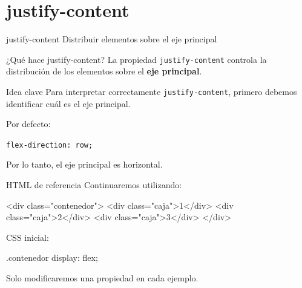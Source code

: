 \documentclass[aspectratio=169,11.5pt]{beamer}
\begin{document}

    \section{justify-content}

    \SectionSlide
    {justify-content}
    {Distribuir elementos sobre el eje principal}

    \begin{frame}{¿Qué hace justify-content?}
        La propiedad \texttt{justify-content}
        controla la distribución de los elementos
        sobre el \textbf{eje principal}.

        \begin{block}{Idea clave}
            Para interpretar correctamente
            \texttt{justify-content},
            primero debemos identificar
            cuál es el eje principal.
        \end{block}

        Por defecto:

        \begin{center}
            \texttt{flex-direction: row;}
        \end{center}

        Por lo tanto, el eje principal es horizontal.
    \end{frame}

    \begin{frame}[fragile]{HTML de referencia}
        Continuaremos utilizando:

        \begin{htmlcodedark}
            <div class="contenedor">
            <div class="caja">1</div>
            <div class="caja">2</div>
            <div class="caja">3</div>
            </div>
        \end{htmlcodedark}

        CSS inicial:

        \begin{csscodedark}
            .contenedor {
                display: flex;
            }
        \end{csscodedark}

        Solo modificaremos una propiedad
        en cada ejemplo.
    \end{frame}
\end{document}
